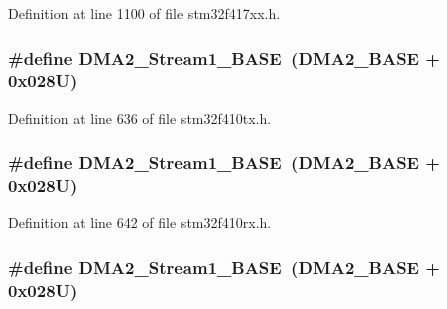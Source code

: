 Definition at line 1100 of file stm32f417xx.\+h.

\subsubsection[{\texorpdfstring{D\+M\+A2\+\_\+\+Stream1\+\_\+\+B\+A\+SE}{DMA2_Stream1_BASE}}]{\setlength{\rightskip}{0pt plus 5cm}\#define D\+M\+A2\+\_\+\+Stream1\+\_\+\+B\+A\+SE~({\bf D\+M\+A2\+\_\+\+B\+A\+SE} + 0x028\+U)}\hypertarget{group___peripheral__registers__structures_ga35512bdc3f5e9df4557c2fbe7935d0b1}{}\label{group___peripheral__registers__structures_ga35512bdc3f5e9df4557c2fbe7935d0b1}


Definition at line 636 of file stm32f410tx.\+h.

\subsubsection[{\texorpdfstring{D\+M\+A2\+\_\+\+Stream1\+\_\+\+B\+A\+SE}{DMA2_Stream1_BASE}}]{\setlength{\rightskip}{0pt plus 5cm}\#define D\+M\+A2\+\_\+\+Stream1\+\_\+\+B\+A\+SE~({\bf D\+M\+A2\+\_\+\+B\+A\+SE} + 0x028\+U)}\hypertarget{group___peripheral__registers__structures_ga35512bdc3f5e9df4557c2fbe7935d0b1}{}\label{group___peripheral__registers__structures_ga35512bdc3f5e9df4557c2fbe7935d0b1}


Definition at line 642 of file stm32f410rx.\+h.

\subsubsection[{\texorpdfstring{D\+M\+A2\+\_\+\+Stream1\+\_\+\+B\+A\+SE}{DMA2_Stream1_BASE}}]{\setlength{\rightskip}{0pt plus 5cm}\#define D\+M\+A2\+\_\+\+Stream1\+\_\+\+B\+A\+SE~({\bf D\+M\+A2\+\_\+\+B\+A\+SE} + 0x028\+U)}\hypertarget{group___peripheral__registers__structures_ga35512bdc3f5e9df4557c2fbe7935d0b1}{}\label{group___peripheral__registers__structures_ga35512bdc3f5e9df4557c2fbe7935d0b1}


